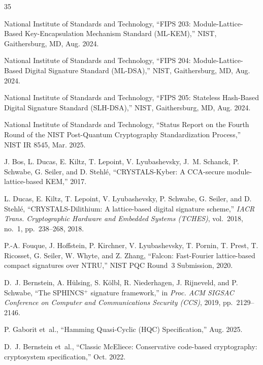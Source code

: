 \documentclass[conference]{IEEEtran}
\newcommand{\etal}{et~al.\xspace}
\begin{document}

\begin{thebibliography}{35}

National Institute of Standards and Technology, ``FIPS 203: Module-Lattice-Based Key-Encapsulation Mechanism Standard (ML-KEM),'' NIST, Gaithersburg, MD, Aug. 2024.

National Institute of Standards and Technology, ``FIPS 204: Module-Lattice-Based Digital Signature Standard (ML-DSA),'' NIST, Gaithersburg, MD, Aug. 2024.

National Institute of Standards and Technology, ``FIPS 205: Stateless Hash-Based Digital Signature Standard (SLH-DSA),'' NIST, Gaithersburg, MD, Aug. 2024.

National Institute of Standards and Technology, ``Status Report on the Fourth Round of the NIST Post-Quantum Cryptography Standardization Process,'' NIST IR 8545, Mar. 2025.

J. Bos, L. Ducas, E. Kiltz, T. Lepoint, V. Lyubashevsky, J.~M. Schanck, P. Schwabe, G. Seiler, and D. Stehl{\'e}, ``CRYSTALS-Kyber: A CCA-secure module-lattice-based KEM,'' 2017.

L. Ducas, E. Kiltz, T. Lepoint, V. Lyubashevsky, P. Schwabe, G. Seiler, and D. Stehl{\'e}, ``CRYSTALS-Dilithium: A lattice-based digital signature scheme,'' \emph{IACR Trans. Cryptographic Hardware and Embedded Systems (TCHES)}, vol.~2018, no.~1, pp.~238--268, 2018.

P.-A. Fouque, J. Hoffstein, P. Kirchner, V. Lyubashevsky, T. Pornin, T. Prest, T. Ricosset, G. Seiler, W. Whyte, and Z. Zhang, ``Falcon: Fast-Fourier lattice-based compact signatures over NTRU,'' NIST PQC Round~3 Submission, 2020.

D.~J. Bernstein, A. H{\"u}lsing, S. K{\"o}lbl, R. Niederhagen, J. Rijneveld, and P. Schwabe, ``The SPHINCS$^+$ signature framework,'' in \emph{Proc. ACM SIGSAC Conference on Computer and Communications Security (CCS)}, 2019, pp.~2129--2146.

P. Gaborit \etal, ``Hamming Quasi-Cyclic (HQC) Specification,'' Aug. 2025.

D.~J. Bernstein \etal, ``Classic McEliece: Conservative code-based cryptography: cryptosystem specification,'' Oct. 2022.


\end{thebibliography}
\end{document}
